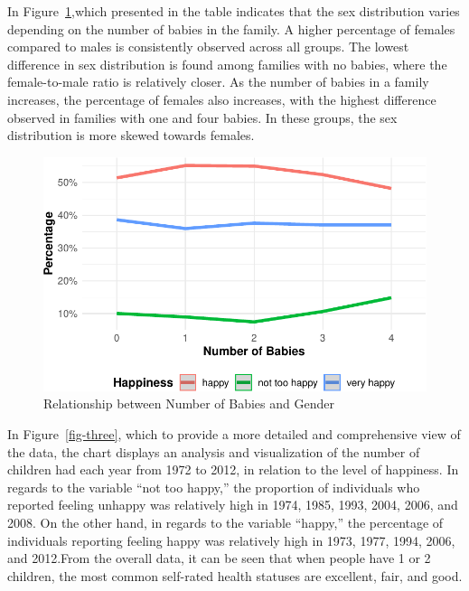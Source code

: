 \documentclass[
  letterpaper,
  DIV=11,
  numbers=noendperiod]{scrartcl}
\begin{document}
In Figure~\ref{fig-two},which presented in the table indicates that the
sex distribution varies depending on the number of babies in the family.
A higher percentage of females compared to males is consistently
observed across all groups. The lowest difference in sex distribution is
found among families with no babies, where the female-to-male ratio is
relatively closer. As the number of babies in a family increases, the
percentage of females also increases, with the highest difference
observed in families with one and four babies. In these groups, the sex
distribution is more skewed towards females.

\begin{figure}

{\centering \includegraphics{paper_files/figure-pdf/fig-two-1.pdf}

}

\caption{\label{fig-two}Relationship between Number of Babies and
Gender}

\end{figure}

In Figure~\ref{fig-three}, which to provide a more detailed and
comprehensive view of the data, the chart displays an analysis and
visualization of the number of children had each year from 1972 to 2012,
in relation to the level of happiness. In regards to the variable ``not
too happy,'' the proportion of individuals who reported feeling unhappy
was relatively high in 1974, 1985, 1993, 2004, 2006, and 2008. On the
other hand, in regards to the variable ``happy,'' the percentage of
individuals reporting feeling happy was relatively high in 1973, 1977,
1994, 2006, and 2012.From the overall data, it can be seen that when
people have 1 or 2 children, the most common self-rated health statuses
are excellent, fair, and good.
\end{document}
